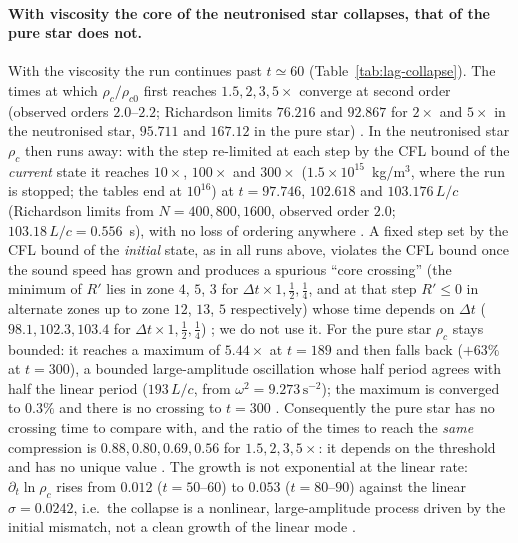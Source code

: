 \documentclass[11pt]{article}
\begin{document}
\paragraph{With viscosity the core of the neutronised star collapses, that of the pure star does not.}  With the viscosity the run continues past $t\simeq60$ (Table~\ref{tab:lag-collapse}).  The times at which $\rho_c/\rho_{c0}$ first reaches $1.5,2,3,5\times$ converge at second order (observed orders $2.0$--$2.2$; Richardson limits $76.216$ and $92.867$ for $2\times$ and $5\times$ in the neutronised star, $95.711$ and $167.12$ in the pure star) \LP.  In the neutronised star $\rho_c$ then runs away: with the step re-limited at each step by the CFL bound of the \emph{current} state it reaches $10\times$, $100\times$ and $300\times$ ($1.5\times10^{15}$~kg/m$^3$, where the run is stopped; the tables end at $10^{16}$) at $t=97.746$, $102.618$ and $103.176\,L/c$ (Richardson limits from $N=400,800,1600$, observed order $2.0$; $103.18\,L/c=0.556$~s), with no loss of ordering anywhere \LP.  A fixed step set by the CFL bound of the \emph{initial} state, as in all runs above, violates the CFL bound once the sound speed has grown and produces a spurious ``core crossing'' (the minimum of $R'$ lies in zone $4$, $5$, $3$ for $\Delta t\times1,\frac12,\frac14$, and at that step $R'\le0$ in alternate zones up to zone $12$, $13$, $5$ respectively) whose time depends on $\Delta t$ ($98.1,102.3,103.4$ for $\Delta t\times1,\frac12,\frac14$) \LP; we do not use it.  For the pure star $\rho_c$ stays bounded: it reaches a maximum of $5.44\times$ at $t=189$ and then falls back ($+63\%$ at $t=300$), a bounded large-amplitude oscillation whose half period agrees with half the linear period ($193\,L/c$, from $\omega^2=9.273\,\mathrm{s^{-2}}$); the maximum is converged to $0.3\%$ and there is no crossing to $t=300$ \LP.  Consequently the pure star has no crossing time to compare with, and the ratio of the times to reach the \emph{same} compression is $0.88,0.80,0.69,0.56$ for $1.5,2,3,5\times$: it depends on the threshold and has no unique value \LP.  The growth is not exponential at the linear rate: $\partial_t\ln\rho_c$ rises from $0.012$ ($t=50$--$60$) to $0.053$ ($t=80$--$90$) against the linear $\sigma=0.0242$, i.e.\ the collapse is a nonlinear, large-amplitude process driven by the initial mismatch, not a clean growth of the linear mode \LC.
\end{document}
